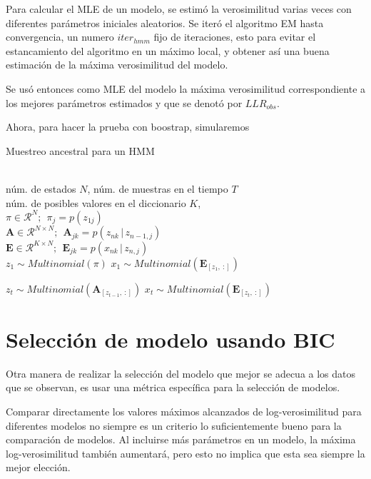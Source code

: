Para calcular el \ac{MLE} de un modelo, se estimó la verosimilitud varias veces con diferentes parámetros iniciales aleatorios. Se iteró el algoritmo \ac{EM} hasta convergencia, un numero $iter_{hmm}$ fijo de iteraciones, esto para evitar el estancamiento del algoritmo en un máximo local, y obtener así una buena estimación de la máxima verosimilitud del modelo.

Se usó entonces como \ac{MLE} del modelo la máxima verosimilitud correspondiente a los mejores parámetros estimados y que se denotó por $LLR_{obs}$.

Ahora, para hacer la prueba con boostrap, simularemos 

\begin{algorithm}[tp]
   \caption{Muestreo ancestral para un HMM}
   \label{alg:ancsamp}
\begin{algorithmic}
    \\
   núm. de estados $N$, núm. de muestras en el tiempo $T$ \\
   núm. de posibles valores en el diccionario $K$, \\
   $ \pi \in \mathcal{R}^{N}; ~~ \pi_j = p(z_{1j})$ \\
   $ \mathbf{A} \in \mathcal{R}^{N \times N}; ~~
   \mathbf{A}_{jk} = p(z_{nk} \,|\, z_{n-1, j})$ \\

   $ \mathbf{E} \in \mathcal{R}^{K \times N}; ~~
   \mathbf{E}_{jk} = p(x_{nk} \,|\, z_{n, j})$\\  
   \STATE
   \STATE $z_1 \sim Multinomial(\pi)$   
   \STATE $x_1 \sim Multinomial(\mathbf{E}_{[z_1,~:]})$

    \STATE $z_t \sim Multinomial(\mathbf{A}_{[z_{t-1},~:]})$ 
    \STATE $x_t \sim Multinomial(\mathbf{E}_{[z_t,~:]})$
   \ENDFOR   
\end{algorithmic}
\end{algorithm}

\section{Selección de modelo usando BIC}

Otra manera de realizar la selección del modelo que mejor se adecua a los datos que se observan, es usar una métrica específica para la selección de modelos.

Comparar directamente los valores máximos alcanzados de log-verosimilitud para diferentes modelos no siempre es un criterio lo suficientemente bueno para la comparación de modelos. Al incluirse más parámetros en un modelo, la máxima log-verosimilitud también aumentará, pero esto no implica que esta sea siempre la mejor elección. 

